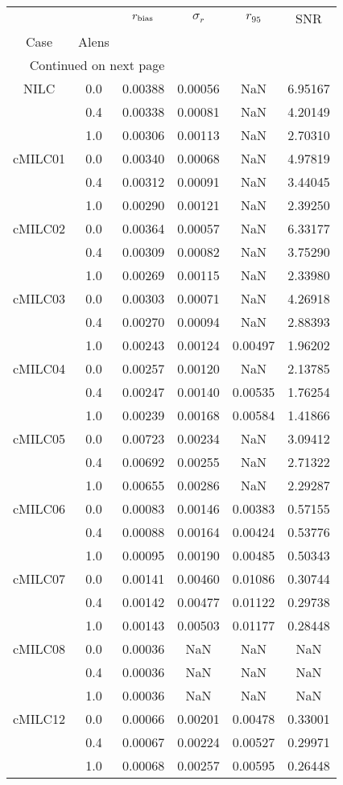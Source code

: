 \begin{longtable}{cccccc}
\toprule
     &     &  $r_{\rm bias}$  &  $\sigma_r$ &  $r_{95}$ &     SNR \\
Case & Alens &                  &             &           &         \\
\midrule
\endhead
\midrule
\multicolumn{3}{r}{{Continued on next page}} \\
\midrule
\endfoot

\bottomrule
\endlastfoot
NILC & 0.0 & 0.00388 & 0.00056 & NaN & 6.95167 \\
     & 0.4 & 0.00338 & 0.00081 & NaN & 4.20149 \\
     & 1.0 & 0.00306 & 0.00113 & NaN & 2.70310 \\
cMILC01 & 0.0 & 0.00340 & 0.00068 & NaN & 4.97819 \\
     & 0.4 & 0.00312 & 0.00091 & NaN & 3.44045 \\
     & 1.0 & 0.00290 & 0.00121 & NaN & 2.39250 \\
cMILC02 & 0.0 & 0.00364 & 0.00057 & NaN & 6.33177 \\
     & 0.4 & 0.00309 & 0.00082 & NaN & 3.75290 \\
     & 1.0 & 0.00269 & 0.00115 & NaN & 2.33980 \\
cMILC03 & 0.0 & 0.00303 & 0.00071 & NaN & 4.26918 \\
     & 0.4 & 0.00270 & 0.00094 & NaN & 2.88393 \\
     & 1.0 & 0.00243 & 0.00124 & 0.00497 & 1.96202 \\
cMILC04 & 0.0 & 0.00257 & 0.00120 & NaN & 2.13785 \\
     & 0.4 & 0.00247 & 0.00140 & 0.00535 & 1.76254 \\
     & 1.0 & 0.00239 & 0.00168 & 0.00584 & 1.41866 \\
cMILC05 & 0.0 & 0.00723 & 0.00234 & NaN & 3.09412 \\
     & 0.4 & 0.00692 & 0.00255 & NaN & 2.71322 \\
     & 1.0 & 0.00655 & 0.00286 & NaN & 2.29287 \\
cMILC06 & 0.0 & 0.00083 & 0.00146 & 0.00383 & 0.57155 \\
     & 0.4 & 0.00088 & 0.00164 & 0.00424 & 0.53776 \\
     & 1.0 & 0.00095 & 0.00190 & 0.00485 & 0.50343 \\
cMILC07 & 0.0 & 0.00141 & 0.00460 & 0.01086 & 0.30744 \\
     & 0.4 & 0.00142 & 0.00477 & 0.01122 & 0.29738 \\
     & 1.0 & 0.00143 & 0.00503 & 0.01177 & 0.28448 \\
cMILC08 & 0.0 & 0.00036 & NaN & NaN & NaN \\
     & 0.4 & 0.00036 & NaN & NaN & NaN \\
     & 1.0 & 0.00036 & NaN & NaN & NaN \\
cMILC12 & 0.0 & 0.00066 & 0.00201 & 0.00478 & 0.33001 \\
     & 0.4 & 0.00067 & 0.00224 & 0.00527 & 0.29971 \\
     & 1.0 & 0.00068 & 0.00257 & 0.00595 & 0.26448 \\
\end{longtable}
